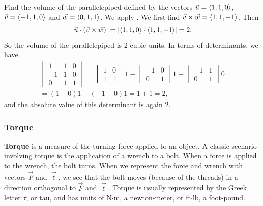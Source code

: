 \begin{example}\label{ex_crossp6}%
Find the volume of the parallelepiped defined by the vectors $\vec u = \left\langle 1,1,0\right\rangle$, $\vec v = \left\langle -1,1,0\right\rangle$ and $\vec w = \left\langle 0,1,1\right\rangle$.
\solution
We apply . We first find $\vec v\times\vec w =\left\langle 1,1,-1\right\rangle$. Then
\[\left\lvert \vec u\cdot(\vec v\times\vec w) \right\rvert = \left\lvert \left\langle 1,1,0\right\rangle\cdot \left\langle 1,1,-1\right\rangle \right\rvert = 2.\]
So the volume of the parallelepiped is 2 cubic units.  In terms of determinants, we have
\begin{multline*}
 \begin{vmatrix}1&1&0\\ -1&1&0\\0&1&1\end{vmatrix}
 =\begin{vmatrix}1&0\\1&1\end{vmatrix}1
 -\begin{vmatrix}-1&0\\0&1\end{vmatrix}1
 +\begin{vmatrix}-1&1\\0&1\end{vmatrix}0\\
 =(1-0)1-(-1-0)1
 =1+1
 =2,
\end{multline*}
and the absolute value of this determinant is again 2.
\end{example}


\subsubsection{Torque}

\textbf{Torque} is a measure of the turning force applied to an object. A classic scenario involving torque is the application of a wrench to a bolt. When a force is applied to the wrench, the bolt turns. When we represent the force and wrench with vectors $\vec F$ and $\vec \ell$, we see that the bolt moves (because of the threads) in a  direction orthogonal to $\vec F$ and $\vec \ell$. Torque is usually represented by the Greek letter $\tau$, or tau, and has units of N$\cdot$m, a newton-meter, or ft$\cdot$lb, a foot-pound.

